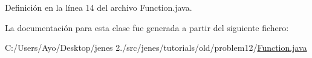 Definición en la línea 14 del archivo Function.\-java.



La documentación para esta clase fue generada a partir del siguiente fichero\-:\begin{DoxyCompactItemize}
\item 
C\-:/\-Users/\-Ayo/\-Desktop/jenes 2./src/jenes/tutorials/old/problem12/\hyperlink{_function_8java}{Function.\-java}\end{DoxyCompactItemize}
